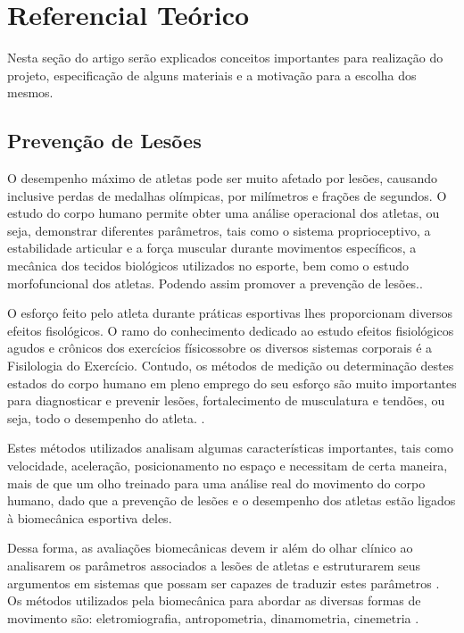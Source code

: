 
\chapter[Referencial Teórico]{Referencial Teórico}
Nesta seção do artigo serão explicados conceitos importantes para realização do projeto, especificação de alguns materiais e a motivação para a escolha dos mesmos.  

\section{Prevenção de Lesões}

O desempenho máximo de atletas pode ser muito afetado por lesões, causando inclusive perdas de medalhas olímpicas, por milímetros e frações de segundos. O estudo do corpo humano permite obter uma análise operacional dos atletas, ou seja, demonstrar diferentes parâmetros, tais como o sistema proprioceptivo, a estabilidade articular e a força muscular durante movimentos específicos, a mecânica dos tecidos biológicos utilizados no esporte, bem como o estudo morfofuncional dos atletas. Podendo assim promover a prevenção de lesões.\cite{miziara2014}.  

O esforço feito pelo atleta durante práticas esportivas lhes proporcionam diversos efeitos fisológicos. O ramo do conhecimento dedicado ao estudo efeitos fisiológicos agudos e crônicos dos exercícios físicossobre os diversos sistemas corporais é a Fisilologia do Exercício. Contudo, os métodos de medição ou determinação destes estados do corpo humano em pleno emprego do seu esforço são muito importantes para diagnosticar e prevenir lesões, fortalecimento de musculatura e tendões, ou seja, todo o desempenho do atleta. \cite{rocha2005}.

Estes métodos utilizados analisam algumas características importantes, tais como velocidade, aceleração, posicionamento no espaço e necessitam  de certa maneira, mais de que um olho treinado para uma análise real do movimento do corpo humano, dado que a prevenção de lesões e o desempenho dos atletas estão ligados à biomecânica esportiva deles\cite{amadio2000}.

Dessa forma, as avaliações biomecânicas devem ir além do olhar clínico ao analisarem os parâmetros associados a lesões de atletas e estruturarem seus argumentos em sistemas que possam ser capazes de traduzir estes parâmetros \cite{miziara2014}. Os métodos utilizados pela biomecânica para abordar as diversas formas de movimento são: eletromiografia, antropometria, dinamometria, cinemetria \cite{amadio2007}.

